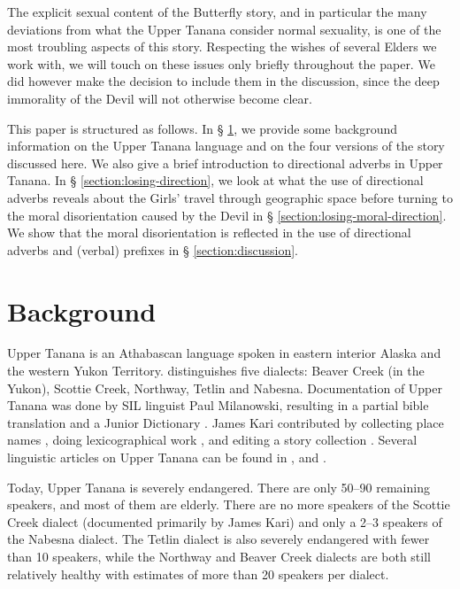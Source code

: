 The explicit sexual content of the Butterfly story, and in particular the many deviations from what the Upper Tanana consider normal sexuality, is one of the most troubling aspects of this story. Respecting the wishes of several Elders we work with, we will touch on these issues only briefly throughout the paper. We did however make the decision to include them in the discussion, since the deep immorality of the Devil will not otherwise become clear.

This paper is structured as follows. In § \ref{section:background}, we provide some background information on the Upper Tanana language and on the four versions of the story discussed here. We also give a brief introduction to directional adverbs in Upper Tanana. In § \ref{section:losing-direction}, we look at what the use of directional adverbs reveals about the Girls' travel through geographic space before turning to the moral disorientation caused by the Devil in § \ref{section:losing-moral-direction}. We show that the moral disorientation is reflected in the use of directional adverbs and (verbal) prefixes in § \ref{section:discussion}.

\section{Background}
\label{section:background}

Upper Tanana is an Athabascan language spoken in eastern interior Alaska and the western Yukon Territory. \citet{MinouraN1994} distinguishes five dialects: Beaver Creek (in the Yukon), Scottie Creek, Northway, Tetlin and Nabesna. Documentation of Upper Tanana was done by SIL linguist Paul Milanowski, resulting in a partial bible translation \citep{MilanowskiPJohnA1966, MilanowskiPJohnA1972} and a Junior Dictionary \citep{MilanowskiPJimersonS1975, MilanowskiPJohnA1979}. James Kari contributed by collecting place names \citep{KariJ1997UTmap}, doing lexicographical work \citep{KariJ1997stem}, and editing a story collection \citep{TyoneM1996}. Several linguistic articles on Upper Tanana can be found in \citet{MinouraN1994, MinouraN1997, TuttleSLovickONunez-OrtizI2011}, and \citet{LovickO2012a-metaphor, LovickO2012b-genre}.

Today, Upper Tanana is severely endangered. There are only 50–90 remaining speakers, and most of them are elderly. There are no more speakers of the Scottie Creek dialect (documented primarily by James Kari) and only a 2–3 speakers of the Nabesna dialect. The Tetlin dialect is also severely endangered with fewer than 10 speakers, while the Northway and Beaver Creek dialects are both still relatively healthy with estimates of more than 20 speakers per dialect.


